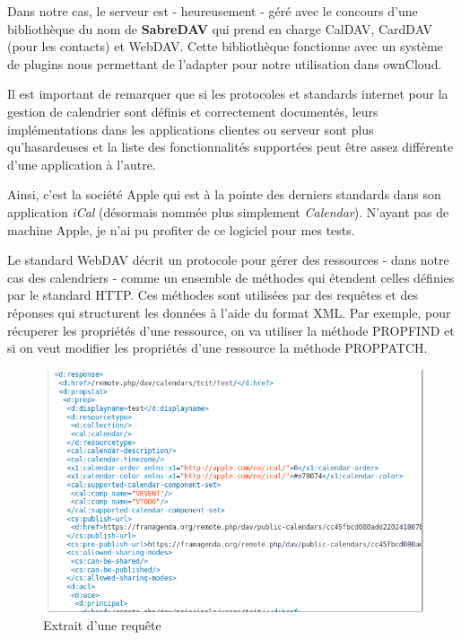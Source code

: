 \documentclass[10pt,a4paper, twoside]{report}
\begin{document}
	Dans notre cas, le serveur est - heureusement - géré avec le concours d'une bibliothèque du nom de \textbf{SabreDAV} qui prend en charge CalDAV, CardDAV (pour les contacts) et WebDAV. Cette bibliothèque fonctionne avec un système de plugins nous permettant de l'adapter pour notre utilisation dans ownCloud.
	
	Il est important de remarquer que si les protocoles et standards internet pour la gestion de calendrier sont définis et correctement documentés, leurs implémentations dans les applications clientes ou serveur sont plus qu'hasardeuses et la liste des fonctionnalités supportées peut être assez différente d'une application à l'autre.
	
	Ainsi, c'est la société Apple qui est à la pointe des derniers standards dans son application \textit{iCal} (désormais nommée plus simplement \textit{Calendar}). N'ayant pas de machine Apple, je n'ai pu profiter de ce logiciel pour mes tests.
	
	Le standard WebDAV décrit un protocole pour gérer des ressources - dans notre cas des calendriers - comme un ensemble de méthodes qui étendent celles définies par le standard HTTP. Ces méthodes sont utilisées par des requêtes et des réponses qui structurent les données à l'aide du format XML. Par exemple, pour récuperer les propriétés d'une ressource, on va utiliser la méthode PROPFIND et si on veut modifier les propriétés d'une ressource la méthode PROPPATCH.
	
	\begin{figure}[ht]
		\centering
		\includegraphics[width=1\textwidth]{images/requete-xml.png}
		\caption*{Extrait d'une requête}
		\label{normal_case}
	\end{figure}
	
\end{document}
